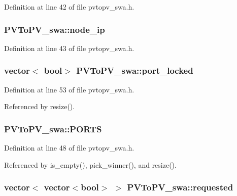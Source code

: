 Definition at line 42 of file pvtopv\_\-swa.h.
\subsubsection[{node\_\-ip}]{ {\bf PVToPV\_\-swa::node\_\-ip}}\label{classPVToPV__swa_081f3bfa27f295b8fa262cb9ffdc50fa}




Definition at line 43 of file pvtopv\_\-swa.h.
\subsubsection[{port\_\-locked}]{\setlength{\rightskip}{0pt plus 5cm}vector$<$ bool$>$ {\bf PVToPV\_\-swa::port\_\-locked}\hspace{0.3cm}{\tt  [private]}}\label{classPVToPV__swa_37516d42ab60a7f1d5a8ae02e46d8c1d}




Definition at line 53 of file pvtopv\_\-swa.h.

Referenced by resize().
\subsubsection[{PORTS}]{ {\bf PVToPV\_\-swa::PORTS}\hspace{0.3cm}{\tt  [private]}}\label{classPVToPV__swa_e26da6f28cfcb9aedc975f3d5ce79fae}




Definition at line 48 of file pvtopv\_\-swa.h.

Referenced by is\_\-empty(), pick\_\-winner(), and resize().
\subsubsection[{requested}]{\setlength{\rightskip}{0pt plus 5cm}vector$<$ vector$<$bool$>$ $>$ {\bf PVToPV\_\-swa::requested}\hspace{0.3cm}{\tt  [private]}}\label{classPVToPV__swa_eeaceda0d51c7985898bdee1eadcb3d2}




